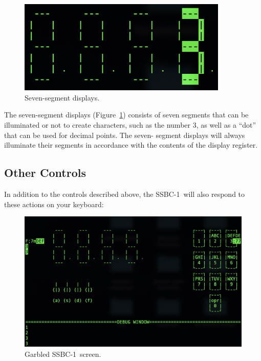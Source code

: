 \documentclass[12pt]{article}
\newcommand{\SSBC}{SSBC-1}
\begin{document}
\begin{figure}
    \centering
    \includegraphics[width=10cm]{7segment}
    \caption{Seven-segment displays.\label{fig:7segment}}
\end{figure}

The seven-segment displays (Figure~\ref{fig:7segment}) consists of seven
segments that can be illuminated or not to create characters, such as the
number $3$, as well as a ``dot'' that can be used for decimal points. The seven-
segment displays will always illuminate their segments in accordance with the
contents of the display register.

\subsection{Other Controls}

In addition to the controls described above, the \SSBC\ will also respond to
these actions on your keyboard:

\begin{figure}
    \centering
    \includegraphics[width=15cm]{garbled}
    \caption{Garbled \SSBC\  screen.\label{fig:garbled}}
\end{figure}
\end{document}
